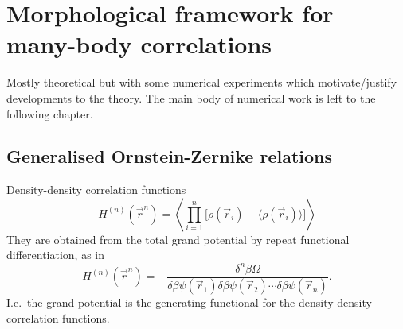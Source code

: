 \documentclass[12pt]{report}
\begin{document}
\chapter{Morphological framework for many-body correlations}
Mostly theoretical but with some numerical experiments which motivate/justify developments to the theory.
The main body of numerical work is left to the following chapter.

\section{Generalised Ornstein-Zernike relations}

Density-density correlation functions
\begin{equation}
  H^{(n)}(\vec{r}^n) =
  \left\langle
  \prod_{i=1}^n
  \Big[ \rho(\vec{r}_i) - \big\langle\rho(\vec{r}_i)\big\rangle \Big]
  \right\rangle
\end{equation}
They are obtained from the total grand potential by repeat functional differentiation, as in
\begin{equation}
  H^{(n)}(\vec{r}^n) =
  - \frac{\delta^n \beta \Omega}{\delta \beta\psi(\vec{r}_1) \delta \beta\psi(\vec{r}_2) \cdots \delta \beta\psi(\vec{r}_n)}.
\end{equation}
I.e.\ the grand potential is the generating functional for the density-density correlation functions.
\end{document}
